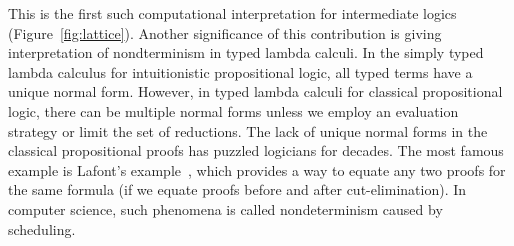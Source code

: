 This is the first such computational
interpretation for intermediate logics (Figure~\ref{fig:lattice}).
Another significance of this contribution
is giving interpretation of nondterminism in typed
lambda calculi.  In the simply typed lambda calculus for intuitionistic
propositional logic, all typed terms have a unique normal form.
However, in typed lambda calculi for classical propositional logic,
there can be multiple normal forms unless we employ an evaluation
strategy or limit the set of reductions.
The lack of unique normal forms in the classical propositional proofs
has puzzled logicians for decades.
The most famous example is Lafont's
example~\citep[B.1.]{girard1989proofs}, which provides a way to equate
any two proofs for the same formula (if we equate proofs before and
after cut-elimination).
In computer science, such phenomena is called nondeterminism caused by scheduling.
